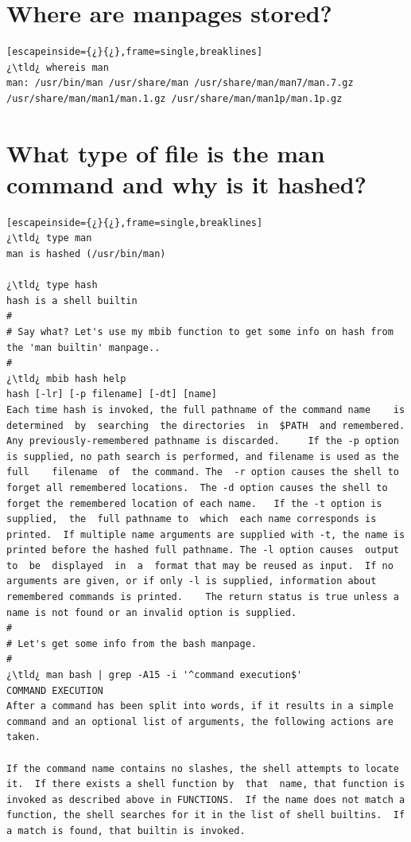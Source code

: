 \section{Where are manpages stored?}

\begin{lstlisting}[escapeinside={¿}{¿},frame=single,breaklines]
¿\tld¿ whereis man
man: /usr/bin/man /usr/share/man /usr/share/man/man7/man.7.gz /usr/share/man/man1/man.1.gz /usr/share/man/man1p/man.1p.gz
\end{lstlisting}

\section{What type of file is the man command and why is it hashed?}

\begin{lstlisting}[escapeinside={¿}{¿},frame=single,breaklines]
¿\tld¿ type man
man is hashed (/usr/bin/man)

¿\tld¿ type hash
hash is a shell builtin
#
# Say what? Let's use my mbib function to get some info on hash from the 'man builtin' manpage..
#
¿\tld¿ mbib hash help
hash [-lr] [-p filename] [-dt] [name]
Each time hash is invoked, the full pathname of the command name	is  determined	by  searching  the directories  in  $PATH  and remembered.  Any previously-remembered pathname is discarded.	 If the -p option is supplied, no path search is performed, and filename is used as the full	filename  of  the command. The  -r option causes the shell to forget all remembered locations.  The -d option causes the shell to forget the remembered location of each name.	 If the -t option is  supplied,	 the  full pathname	to  which  each name corresponds is printed.  If multiple name arguments are supplied with -t, the name is printed before the hashed full pathname.	The -l option causes  output  to  be  displayed  in  a  format that may be reused as input.  If no arguments are given, or if only -l is supplied, information about remembered commands is printed.	The return status is true unless a name is not found or an invalid option is supplied.
#
# Let's get some info from the bash manpage.
#
¿\tld¿ man bash | grep -A15 -i '^command execution$'
COMMAND EXECUTION
After a command has been split into words, if it results in a simple command and an optional list of arguments, the following actions are taken.

If the command name contains no slashes, the shell attempts to locate it.  If there exists a shell function by  that  name, that function is invoked as described above in FUNCTIONS.  If the name does not match a function, the shell searches for it in the list of shell builtins.  If a match is found, that builtin is invoked.


\end{lstlisting}
